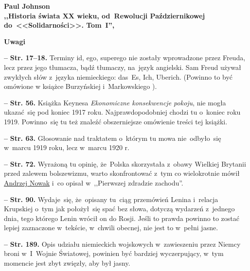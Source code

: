 \documentclass[a4paper,11pt]{article}  %
\newcommand{\spaceFour}{0.5em}
\newcommand{\tb}{\textbf}
\newcommand{\noi}{\noindent}
\newcommand{\start}{\noi \tb{--} {}}
\newcommand{\Str}[1]{\tb{Str. #1.}}
\newcommand{\Center}[1]{\begin{center} #1 \end{center}}
\newcommand{\CenterTB}[1]{\Center{\tb{#1}}}
\newcommand{\Work}[1]{ \begin{center} {\large \tb{#1}} \end{center} }
\begin{document}
\Work{
  Paul Johnson \\
  ,,Historia świata XX wieku, od~Rewolucji Październikowej \\
  do~<<Solidarności>>. Tom~I'',
  \cite{JohnsonHistoriaSwiataXXWiekuvI09} }


\CenterTB{Uwagi}

\start \Str{17--18} Terminy id, ego, superego nie zostały wprowadzone
przez Freuda, lecz przez jego tłumacza, bądź tłumaczy, na~język
angielski. Sam Freud używał zwykłych słów z~języka niemieckiego:
das~Es, Ich, Uberich. (Powinno to być omówione w książce Burzyńskiej
i~Markowskiego \cite{BM09}).

\vspace{\spaceFour}


\start \Str{56} Książka Keynesa \emph{Ekonomiczne konsekwencje
  pokoju}, nie mogła ukazać~się pod koniec 1917 roku.
Najprawdopodobniej chodzi tu o~koniec roku 1919. Powinno~się tu też
znaleźć obszerniejsze omówienie treści tej książki.

\vspace{\spaceFour}


\start \Str{63} Głosowanie nad traktatem o~którym tu mowa
nie~odbyło~się w~marcu 1919 roku, lecz w~marcu 1920 r.

\vspace{\spaceFour}


\start \Str{72} Wyrażoną tu opinię, że~Polska skorzystała z~obawy
Wielkiej Brytanii przed zalewem bolszewizmu, warto skonfrontować z~tym
co wielokrotnie mówił
\href{https://www.youtube.com/watch?v=yfQ7rpq_irA}{Andrzej Nowak} i~co
opisał w~,,Pierwszej zdradzie zachodu''.

\vspace{\spaceFour}


\start \Str{90} Wydaje~się, że~opisany tu~ciąg przemówień Lenina
i~relacja Krupskiej o~tym jak położył~się spać bez słowa, dotyczą
wydarzeń z~jednego dnia, tego którego Lenin wrócił on do Rosji. Jeśli
to prawda powinno to zostać lepiej zaznaczone w~tekście, w~chwili
obecnej, nie jest to w~pełni jasne.

\vspace{\spaceFour}


\start \Str{189} Opis udziału niemieckich wojskowych w~zawieszeniu
przez Niemcy broni w~I~Wojnie Światowej, powinien być bardziej
wyczerpujący, w~tym momencie jest zbyt zwięzły, aby był jasny.

\vspace{\spaceFour}
\end{document}
